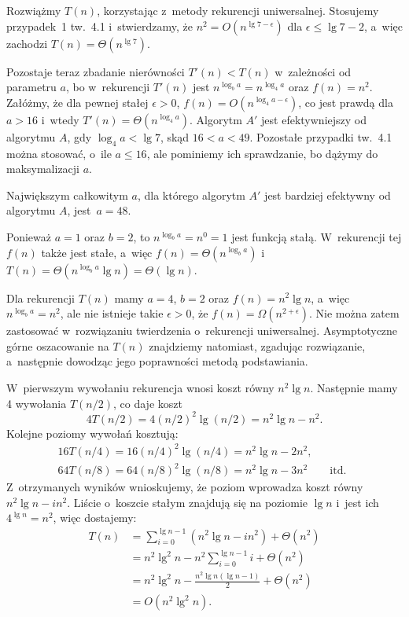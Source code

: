 \exercise %
Rozwiążmy $T(n)$, korzystając z~metody rekurencji uniwersalnej. Stosujemy przypadek~1 tw.~4.1 i~stwierdzamy, że $n^2=O(n^{\lg7-\epsilon})$ dla $\epsilon\le\lg7-2$, a~więc zachodzi $T(n)=\Theta(n^{\lg7})$.

Pozostaje teraz zbadanie nierówności $T'(n)<T(n)$ w~zależności od parametru $a$, bo w~rekurencji $T'(n)$ jest $n^{\log_ba}=n^{\log_4a}$ oraz $f(n)=n^2$. Załóżmy, że dla pewnej stałej $\epsilon>0$, $f(n)=O(n^{\log_4a-\epsilon})$, co jest prawdą dla $a>16$ i~wtedy $T'(n)=\Theta(n^{\log_4a})$. Algorytm $A'$ jest efektywniejszy od algorytmu $A$, gdy $\log_4a<\lg7$, skąd $16<a<49$. Pozostałe przypadki tw.~4.1 można stosować, o~ile $a\le16$, ale pominiemy ich sprawdzanie, bo dążymy do maksymalizacji $a$.

Największym całkowitym $a$, dla którego algorytm $A'$ jest bardziej efektywny od algorytmu $A$, jest~$a=48$.

\exercise %
Ponieważ $a=1$ oraz $b=2$, to $n^{\log_ba}=n^0=1$ jest funkcją stałą. W~rekurencji tej $f(n)$ także jest stałe, a~więc $f(n)=\Theta(n^{\log_ba})$ i~$T(n)=\Theta(n^{\log_ba}\lg n)=\Theta(\lg n)$.

\exercise %
Dla rekurencji $T(n)$ mamy $a=4$, $b=2$ oraz $f(n)=n^2\lg n$, a~więc $n^{\log_ba}=n^2$, ale nie istnieje takie $\epsilon>0$, że $f(n)=\Omega(n^{2+\epsilon})$. Nie można zatem zastosować w~rozwiązaniu twierdzenia o~rekurencji uniwersalnej. Asymptotyczne górne oszacowanie na $T(n)$ znajdziemy natomiast, zgadując rozwiązanie, a~następnie dowodząc jego poprawności metodą podstawiania.

W~pierwszym wywołaniu rekurencja wnosi koszt równy $n^2\lg n$. Następnie mamy 4 wywołania $T(n/2)$, co daje koszt
\[
	4T(n/2) = 4(n/2)^2\lg(n/2) = n^2\lg n-n^2.
\]
Kolejne poziomy wywołań kosztują:
\begin{gather*}
	16T(n/4) = 16(n/4)^2\lg(n/4) = n^2\lg n-2n^2, \qquad\phantom{\text{itd.}} \\
	64T(n/8) = 64(n/8)^2\lg(n/8) = n^2\lg n-3n^2 \qquad\text{itd.}
\end{gather*}
Z~otrzymanych wyników wnioskujemy, że  poziom wprowadza koszt równy $n^2\lg n-in^2$. Liście o~koszcie stałym znajdują się na poziomie $\lg n$ i~jest ich $4^{\lg n}=n^2$, więc dostajemy:
\begin{align*}
	T(n) &= \sum_{i=0}^{\lg n-1}(n^2\lg n-in^2)+\Theta(n^2) \\
	&= n^2\lg^2n-n^2\sum_{i=0}^{\lg n-1}i+\Theta(n^2) \\[1mm]
	&= n^2\lg^2n-\frac{n^2\lg n(\lg n-1)}{2}+\Theta(n^2) \\[1mm]
	&= O(n^2\lg^2n).
\end{align*}

